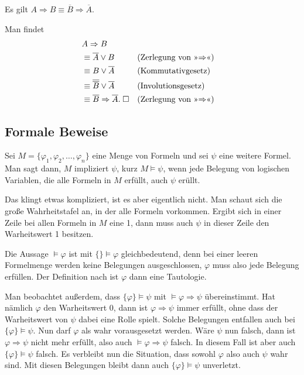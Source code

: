 \begin{Satz}
Es gilt $A\Rightarrow B\equiv \overline B\Rightarrow\overline A$.
\end{Satz}
 Man findet
\begin{align}
&A\Rightarrow B\\
&\equiv \overline A\lor B && (\text{Zerlegung von »$\Rightarrow$«})\\
&\equiv B\lor\overline A && (\text{Kommutativgesetz})\\
&\equiv \overline{\overline B}\lor\overline A && (\text{Involutionsgesetz})\\
&\equiv \overline B\Rightarrow\overline A.\;\Box
  && (\text{Zerlegung von »$\Rightarrow$«)}
\end{align}

\subsection{Formale Beweise}
\begin{Definition}
Sei $M=\{\varphi_1,\varphi_2,\ldots,\varphi_n\}$ eine Menge von
Formeln und sei $\psi$ eine weitere Formel. Man sagt dann, $M$
impliziert $\psi$, kurz $M\models\psi$, wenn jede Belegung von
logischen Variablen, die alle Formeln in $M$ erfüllt, auch $\psi$
erüllt.
\end{Definition}
Das klingt etwas kompliziert, ist es aber eigentlich nicht. Man schaut
sich die große Wahrheitstafel an, in der alle Formeln vorkommen.
Ergibt sich in einer Zeile bei allen Formeln in $M$ eine 1, dann muss
auch $\psi$ in dieser Zeile den Warheitswert 1 besitzen.

Die Aussage $\models\varphi$ ist mit $\{\}\models\varphi$
gleichbedeutend, denn bei einer leeren Formelmenge werden keine
Belegungen ausgeschlossen, $\varphi$ muss also jede Belegung
erfüllen. Der Definition nach ist $\varphi$ dann eine Tautologie.

Man beobachtet außerdem, dass $\{\varphi\}\models\psi$ mit
$\models\varphi\Rightarrow\psi$ übereinstimmt. Hat nämlich
$\varphi$ den Warheitswert 0, dann ist $\varphi\Rightarrow\psi$
immer erfüllt, ohne dass der Warheitswert von $\psi$ dabei eine
Rolle spielt. Solche Belegungen entfallen auch bei
$\{\varphi\}\models\psi$. Nun darf $\varphi$ als wahr vorausgesetzt
werden. Wäre $\psi$ nun falsch, dann ist $\varphi\Rightarrow\psi$
nicht mehr erfüllt, also auch $\models\varphi\Rightarrow\psi$ falsch.
In diesem Fall ist aber auch $\{\varphi\}\models\psi$ falsch.
Es verbleibt nun die Situation, dass sowohl $\varphi$ also auch
$\psi$ wahr sind. Mit diesen Belegungen bleibt dann auch
$\{\varphi\}\models\psi$ unverletzt.

